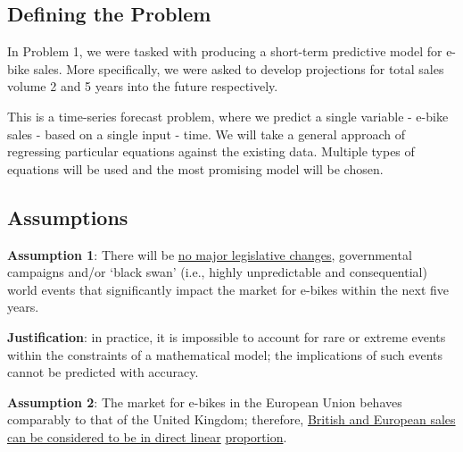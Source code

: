 \graphicspath{{../../res/img/}{../../res/graphs/}}

\subsection{Defining the Problem}
In Problem 1, we were tasked with producing a short-term predictive model for e-bike sales.
More specifically, we were asked to develop projections for total sales volume 2 and 5 years into the future respectively.

This is a time-series forecast problem, where we predict a single variable - e-bike sales - based on a single input - time.
We will take a general approach of regressing particular equations against the existing data.
Multiple types of equations will be used and the most promising model will be chosen.

\subsection{Assumptions}
\noindent\textbf{Assumption 1}: There will be \underline{no major legislative changes}, governmental campaigns and/or ‘black swan’ (i.e., highly unpredictable and consequential) world events that significantly impact the market for e-bikes within the next five years.

\vspace{-6pt}
\noindent\textbf{Justification}: in practice, it is impossible to account for rare or extreme events within the constraints of a mathematical model; the implications of such events cannot be predicted with accuracy.

\noindent\textbf{Assumption 2}: The market for e-bikes in the European Union behaves comparably to that of the United Kingdom; therefore, \underline{British and European sales can be considered to be in direct linear} \underline{proportion}.

